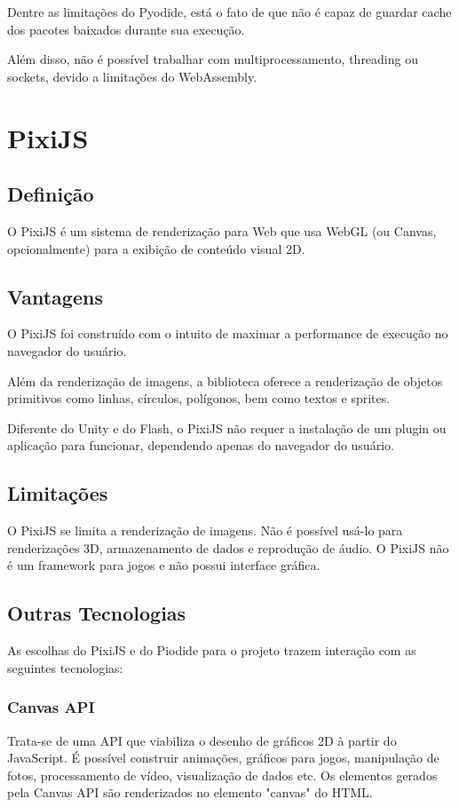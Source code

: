 Dentre as limitações do Pyodide, está o fato de que não é capaz de guardar cache dos pacotes baixados durante sua execução.

Além disso, não é possível trabalhar com multiprocessamento, threading ou sockets, devido a limitações do WebAssembly.

\section{PixiJS}

\subsection{Definição}

O PixiJS é um sistema de renderização para Web que usa WebGL (ou Canvas, opcionalmente) para a exibição de conteúdo visual 2D.

\subsection{Vantagens}

O PixiJS foi construído com o intuito de maximar a performance de execução no navegador do usuário.

Além da renderização de imagens, a biblioteca oferece a renderização de objetos primitivos como linhas, círculos, polígonos, bem como textos e sprites.

Diferente do Unity e do Flash, o PixiJS não requer a instalação de um plugin ou aplicação para funcionar, dependendo apenas do navegador do usuário.

\subsection{Limitações}

O PixiJS se limita a renderização de imagens. Não é possível usá-lo para renderizações 3D, armazenamento de dados e reprodução de áudio. O PixiJS não é um framework para jogos e não possui interface gráfica.


\subsection{Outras Tecnologias}

As escolhas do PixiJS e do Piodide para o projeto trazem interação com as seguintes tecnologias:

\subsubsection{Canvas API}
Trata-se de uma API que viabiliza o desenho de gráficos 2D à partir do JavaScript. É possível construir animações, gráficos para jogos, manipulação de fotos, processamento de vídeo, visualização de dados etc. Os elementos gerados pela Canvas API são renderizados no elemento "canvas" do HTML.

